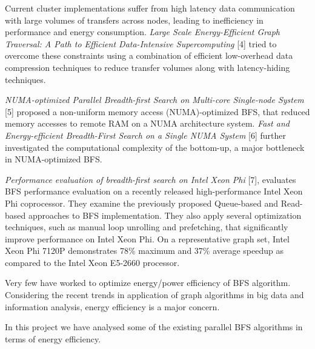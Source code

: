 Current cluster implementations suffer from high latency data communication
with large volumes of transfers across nodes, leading to inefficiency in
performance and energy consumption. \emph{Large Scale Energy-Efficient Graph
Traversal: A Path to Efficient Data-Intensive Supercomputing} [4] tried to
overcome these constraints using a combination of efficient low-overhead data
compression techniques to reduce transfer volumes along with latency-hiding
techniques.

\emph{NUMA-optimized Parallel Breadth-first Search on Multi-core Single-node
System} [5] proposed a non-uniform memory access (NUMA)-optimized BFS, that
reduced memory accesses to remote RAM on a NUMA architecture system.
\emph{Fast and Energy-efficient Breadth-First Search on a Single NUMA System}
[6] further investigated the computational complexity of the bottom-up, a major
bottleneck in NUMA-optimized BFS.

\emph{Performance evaluation of breadth-first search on Intel Xeon Phi} [7],
evaluates BFS performance evaluation on a recently released high-performance
Intel Xeon Phi coprocessor. They examine the previously proposed Queue-based
and Read-based approaches to BFS implementation. They also apply several
optimization techniques, such as manual loop unrolling and prefetching, that
significantly improve performance on Intel Xeon Phi. On a representative graph
set, Intel Xeon Phi 7120P demonstrates 78\% maximum and 37\% average speedup as
compared to the Intel Xeon E5-2660 processor.


Very few have worked to optimize energy/power efficiency of BFS algorithm.
Considering the recent trends in application of graph algorithms in big data
and information analysis, energy efficiency is a major concern.

In this project we have analysed some of the existing parallel BFS algorithms
in terms of energy efficiency.


